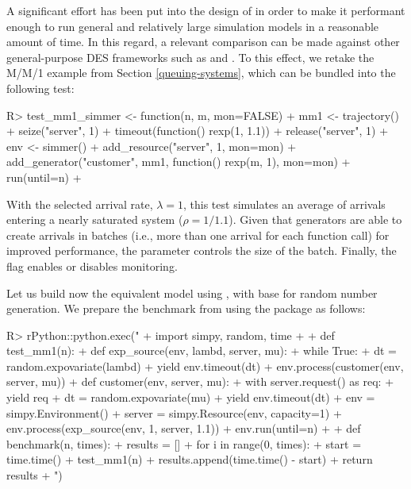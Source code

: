 \documentclass[
  nojss]{jss}
\begin{document}
A significant effort has been put into the design of  in
order to make it performant enough to run general and relatively large
simulation models in a reasonable amount of time. In this regard, a
relevant comparison can be made against other general-purpose DES
frameworks such as  and . To this effect, we
retake the M/M/1 example from Section \ref{queuing-systems}, which can
be bundled into the following test:

\begin{CodeChunk}
\begin{CodeInput}
R> test_mm1_simmer <- function(n, m, mon=FALSE) {
+   mm1 <- trajectory() %
+     seize("server", 1) %
+     timeout(function() rexp(1, 1.1)) %
+     release("server", 1)
+   env <- simmer() %
+     add_resource("server", 1, mon=mon) %
+     add_generator("customer", mm1, function() rexp(m, 1), mon=mon) %
+     run(until=n)
+ }
\end{CodeInput}
\end{CodeChunk}

With the selected arrival rate, \(\lambda=1\), this test simulates an
average of  arrivals entering a nearly saturated system
(\(\rho=1/1.1\)). Given that  generators are able to create
arrivals in batches (i.e., more than one arrival for each function call)
for improved performance, the parameter  controls the size of
the batch. Finally, the  flag enables or disables monitoring.

Let us build now the equivalent model using , with base
 for random number generation. We prepare the
 benchmark from  using the 
package \citep{CRAN:rPython} as follows:

\begin{CodeChunk}
\begin{CodeInput}
R> rPython::python.exec("
+ import simpy, random, time
+ 
+ def test_mm1(n):
+   def exp_source(env, lambd, server, mu):
+       while True:
+           dt = random.expovariate(lambd)
+           yield env.timeout(dt)
+           env.process(customer(env, server, mu))
+   def customer(env, server, mu):
+       with server.request() as req:
+           yield req
+           dt = random.expovariate(mu)
+           yield env.timeout(dt)
+   env = simpy.Environment()
+   server = simpy.Resource(env, capacity=1)
+   env.process(exp_source(env, 1, server, 1.1))
+   env.run(until=n)
+ 
+ def benchmark(n, times):
+   results = []
+   for i in range(0, times):
+     start = time.time()
+     test_mm1(n)
+     results.append(time.time() - start)
+   return results
+ ")
\end{CodeInput}
\end{CodeChunk}
\end{document}
